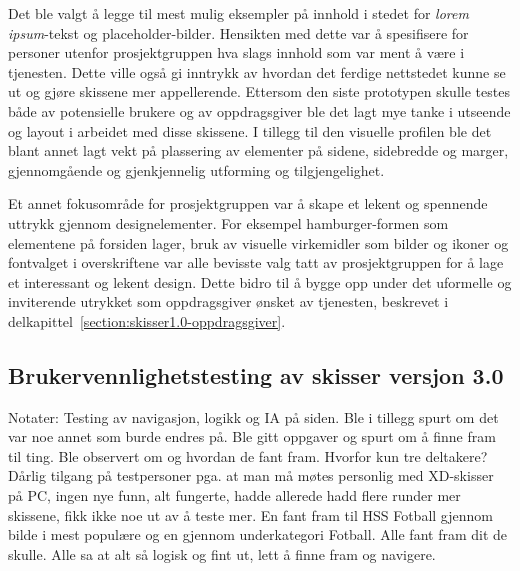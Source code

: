 Det ble valgt å legge til mest mulig eksempler på innhold i stedet for {\em  lorem ipsum}-tekst og placeholder-bilder. Hensikten med dette var å spesifisere for personer utenfor prosjektgruppen hva slags innhold som var ment å være i tjenesten. Dette ville også gi inntrykk av hvordan det ferdige nettstedet kunne se ut og gjøre skissene mer appellerende. Ettersom den siste prototypen skulle testes både av potensielle brukere og av oppdragsgiver ble det lagt mye tanke i utseende og layout i arbeidet med disse skissene. I tillegg til den visuelle profilen ble det blant annet lagt vekt på plassering av elementer på sidene, sidebredde og marger, gjennomgående og gjenkjennelig utforming og tilgjengelighet. 

Et annet fokusområde for prosjektgruppen var å skape et lekent og spennende uttrykk gjennom designelementer. For eksempel hamburger-formen som elementene på forsiden lager, bruk av visuelle virkemidler som bilder og ikoner og fontvalget i overskriftene var alle bevisste valg tatt av prosjektgruppen for å lage et interessant og lekent design. Dette bidro til å bygge opp under det uformelle og inviterende utrykket som oppdragsgiver ønsket av tjenesten, beskrevet i delkapittel~\ref{section:skisser1.0-oppdragsgiver}.

\subsection{Brukervennlighetstesting av skisser versjon 3.0}
Notater:
Testing av navigasjon, logikk og IA på siden.
Ble i tillegg spurt om det var noe annet som burde endres på.
Ble gitt oppgaver og spurt om å finne fram til ting.
Ble observert om og hvordan de fant fram.
Hvorfor kun tre deltakere? Dårlig tilgang på testpersoner pga. at man må møtes personlig med XD-skisser på PC, ingen nye funn, alt fungerte, hadde allerede hadd flere runder mer skissene, fikk ikke noe ut av å teste mer.
En fant fram til HSS Fotball gjennom bilde i mest populære og en gjennom underkategori Fotball.
Alle fant fram dit de skulle.
Alle sa at alt så logisk og fint ut, lett å finne fram og navigere.

